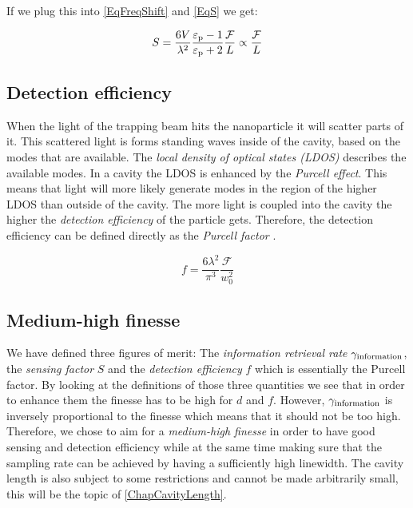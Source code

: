 If we plug this into \autoref{EqFreqShift} and \autoref{EqS} we get:

\begin{equation}\label{EqSensingFactor}
	S=\frac{6V}{\lambda^2}\frac{\de{\varepsilon}{p}-1}{\de{\varepsilon}{p}+2}\frac{\mathcal{F}}{L}\propto\frac{\mathcal{F}}{L}
\end{equation}

\subsection{Detection efficiency}
When the light of the trapping beam hits the nanoparticle it will scatter parts of it. This scattered light is forms standing waves inside of the cavity, based on the modes that are available. The \textit{local density of optical states (LDOS)} describes the available modes. In a cavity the LDOS is enhanced by the \textit{Purcell effect}. This means that light will more likely generate modes in the region of the higher LDOS than outside of the cavity. The more light is coupled into the cavity the higher the \textit{detection efficiency} of the particle gets. Therefore, the detection efficiency can be defined directly as the \textit{Purcell factor} \cite{dowling1991radiation}.

\begin{equation}
	f=\frac{6\lambda^2}{\pi^3}\frac{\mathcal{F}}{w_0^2}
\end{equation}

\subsection{Medium-high finesse}
We have defined three figures of merit: The \textit{information retrieval rate} $\de{\gamma}{information}$, the \textit{sensing factor} $S$ and the \textit{detection efficiency} $f$ which is essentially the Purcell factor. By looking at the definitions of those three quantities we see that in order to enhance them the finesse has to be high for $d$ and $f$. However, $\de{\gamma}{information}$ is inversely proportional to the finesse which means that it should not be too high. Therefore, we chose to aim for a \textit{medium-high finesse} in order to have good sensing and detection efficiency while at the same time making sure that the sampling rate can be achieved by having a sufficiently high linewidth. The cavity length is also subject to some restrictions and cannot be made arbitrarily small, this will be the topic of \autoref{ChapCavityLength}.

